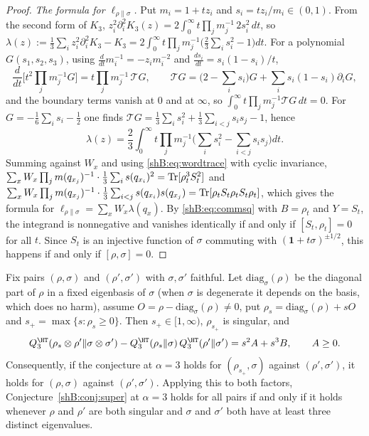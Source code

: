 \begin{proof}
\emph{The formula for $\ell_{\rho\|\sigma}$.} Put $m_i=1+tz_i$ and $s_i=tz_i/m_i\in(0,1)$. From the second form of $K_3$, $z_i^2\partial_i^2K_3(z)=2\int_0^\infty t\prod_jm_j^{-1}\,2s_i^2\,dt$, so $\lambda(z):=\frac13\sum_iz_i^2\partial_i^2K_3-K_3=2\int_0^\infty t\prod_jm_j^{-1}\big(\frac23\sum_is_i^2-1\big)dt$. For a polynomial $G(s_1,s_2,s_3)$, using $\frac{d}{dt}m_i^{-1}=-z_im_i^{-2}$ and $\frac{ds_i}{dt}=s_i(1-s_i)/t$,
\[
\frac{d}{dt}\Big[t^2\prod_jm_j^{-1}G\Big]=t\prod_jm_j^{-1}\,\mathcal TG,\qquad\mathcal TG=\Big(2-\sum_is_i\Big)G+\sum_is_i(1-s_i)\partial_iG,
\]
and the boundary terms vanish at $0$ and at $\infty$, so $\int_0^\infty t\prod_jm_j^{-1}\mathcal TG\,dt=0$. For $G=-\frac16\sum_is_i-\frac12$ one finds $\mathcal TG=\frac13\sum_is_i^2+\frac13\sum_{i<j}s_is_j-1$, hence
\[
\lambda(z)=\frac23\int_0^\infty t\prod_jm_j^{-1}\Big(\sum_is_i^2-\sum_{i<j}s_is_j\Big)dt .
\]
Summing against $W_x$ and using \eqref{shB:eq:wordtrace} with cyclic invariance, $\sum_xW_x\prod_jm(q_{x_j})^{-1}\cdot\frac13\sum_is(q_{x_i})^2=\operatorname{Tr}[\rho_t^3S_t^2]$ and $\sum_xW_x\prod_jm(q_{x_j})^{-1}\cdot\frac13\sum_{i<j}s(q_{x_i})s(q_{x_j})=\operatorname{Tr}[\rho_tS_t\rho_tS_t\rho_t]$, which gives the formula for $\ell_{\rho\|\sigma}=\sum_xW_x\lambda(q_x)$. By \eqref{shB:eq:commsq} with $B=\rho_t$ and $Y=S_t$, the integrand is nonnegative and vanishes identically if and only if $[S_t,\rho_t]=0$ for all $t$. Since $S_t$ is an injective function of $\sigma$ commuting with $(\mathbf 1+t\sigma)^{\pm1/2}$, this happens if and only if $[\rho,\sigma]=0$.
\end{proof}

\begin{corollary}\label{shB:cor:singular}
Fix pairs $(\rho,\sigma)$ and $(\rho',\sigma')$ with $\sigma,\sigma'$ faithful. Let $\mathrm{diag}_\sigma(\rho)$ be the diagonal part of $\rho$ in a fixed eigenbasis of $\sigma$ (when $\sigma$ is degenerate it depends on the basis, which does no harm), assume $O=\rho-\mathrm{diag}_\sigma(\rho)\ne0$, put $\rho_s=\mathrm{diag}_\sigma(\rho)+sO$ and $s_+=\max\{s:\rho_s\ge0\}$. Then $s_+\in[1,\infty)$, $\rho_{s_+}$ is singular, and
\[
Q^\HT_3(\rho_s\otimes\rho'\|\sigma\otimes\sigma')-Q^\HT_3(\rho_s\|\sigma)\,Q^\HT_3(\rho'\|\sigma')=s^2A+s^3B,\qquad A\ge0 .
\]
Consequently, if the conjecture at $\alpha=3$ holds for $(\rho_{s_+},\sigma)$ against $(\rho',\sigma')$, it holds for $(\rho,\sigma)$ against $(\rho',\sigma')$. Applying this to both factors, Conjecture~\ref{shB:conj:super} at $\alpha=3$ holds for all pairs if and only if it holds whenever $\rho$ and $\rho'$ are both singular and $\sigma$ and $\sigma'$ both have at least three distinct eigenvalues.
\end{corollary}

